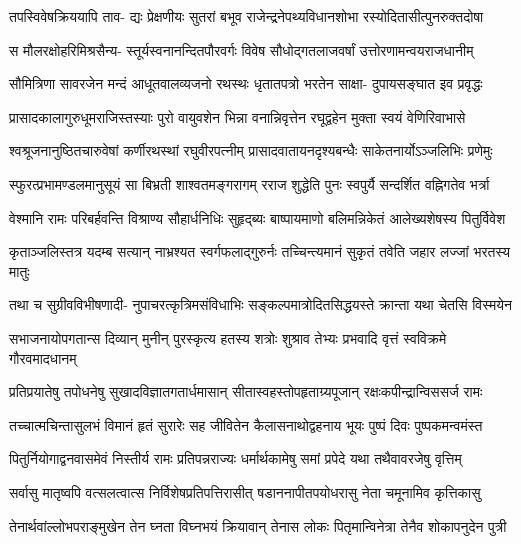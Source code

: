 \fourlineindentedshloka
{तपस्विवेषक्रिययापि ताव-}
{द्यः प्रेक्षणीयः सुतरां बभूव}
{राजेन्द्रनेपथ्यविधानशोभा}
{रस्योदितासीत्पुनरुक्तदोषा} %

\fourlineindentedshloka
{स मौलरक्षोहरिमिश्रसैन्य-}
{स्तूर्यस्वनानन्दितपौरवर्गः}
{विवेष सौधोद्गतलाजवर्षां}
{उत्तोरणामन्वयराजधानीम्} %

\fourlineindentedshloka
{सौमित्रिणा सावरजेन मन्दं}
{आधूतवालव्यजनो रथस्थः}
{धृतातपत्रो भरतेन साक्षा-}
{दुपायसङ्घात इव प्रवृद्धः} %

\twolineshloka
{प्रासादकालागुरुधूमराजिस्तस्याः पुरो वायुवशेन भिन्ना}
{वनान्निवृत्तेन रघूद्वहेन मुक्ता स्वयं वेणिरिवाभासे} %

\fourlineindentedshloka
{श्वश्रूजनानुष्ठितचारुवेषां}
{कर्णीरथस्थां रघुवीरपत्नीम्}
{प्रासादवातायनदृश्यबन्धैः}
{साकेतनार्योऽञ्जलिभिः प्रणेमुः} %

\fourlineindentedshloka
{स्फुरत्प्रभामण्डलमानुसूयं}
{सा बिभ्रती शाश्वतमङ्गरागम्}
{रराज शुद्धेति पुनः स्वपुर्यै}
{सन्दर्शित वह्निगतेव भर्त्रा} %

\fourlineindentedshloka
{वेश्मानि रामः परिबर्हवन्ति}
{विश्राण्य सौहार्धनिधिः सुहृद्ब्यः}
{बाष्पायमाणो बलिमन्निकेतं}
{आलेख्यशेषस्य पितुर्विवेश} %

\fourlineindentedshloka
{कृताञ्जलिस्तत्र यदम्ब सत्यान्}
{नाभ्रश्यत स्वर्गफलाद्गुरुर्नः}
{तच्चिन्त्यमानं सुकृतं तवेति}
{जहार लज्जां भरतस्य मातुः} %

\fourlineindentedshloka
{तथा च सुग्रीवविभीषणादी-}
{नुपाचरत्कृत्रिमसंविधाभिः}
{सङ्कल्पमात्रोदितसिद्धयस्ते}
{क्रान्ता यथा चेतसि विस्मयेन} %

\fourlineindentedshloka
{सभाजनायोपगतान्स दिव्यान्}
{मुनीन् पुरस्कृत्य हतस्य शत्रोः}
{शुश्राव तेभ्यः प्रभवादि वृत्तं}
{स्वविक्रमे गौरवमादधानम्} %

\fourlineindentedshloka
{प्रतिप्रयातेषु तपोधनेषु}
{सुखादविज्ञातगतार्धमासान्}
{सीतास्वहस्तोपहृताग्र्यपूजान्}
{रक्षःकपीन्द्रान्विससर्ज रामः} %

\fourlineindentedshloka
{तच्चात्मचिन्तासुलभं विमानं}
{हृतं सुरारेः सह जीवितेन}
{कैलासनाथोद्वहनाय भूयः}
{पुष्पं दिवः पुष्पकमन्वमंस्त} %

\fourlineindentedshloka
{पितुर्नियोगाद्वनवासमेवं}
{निस्तीर्य रामः प्रतिपन्नराज्यः}
{धर्मार्थकामेषु समां प्रपेदे}
{यथा तथैवावरजेषु वृत्तिम्} %

\twolineshloka
{सर्वासु मातृष्वपि वत्सलत्वात्स निर्विशेषप्रतिपत्तिरासीत्}
{षडाननापीतपयोधरासु नेता चमूनामिव कृत्तिकासु} %

\fourlineindentedshloka
{तेनार्थवांल्लोभपराङ्मुखेन}
{तेन घ्नता विघ्नभयं क्रियावान्}
{तेनास लोकः पितृमान्विनेत्रा}
{तेनैव शोकापनुदेन पुत्री} %

